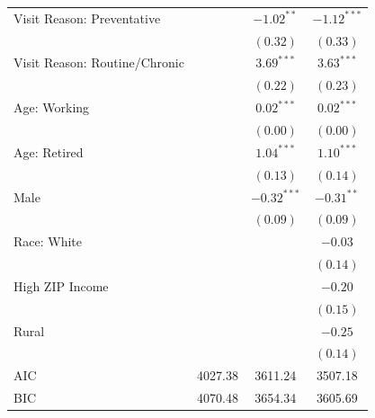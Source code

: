 \documentclass[12pt,twoside]{reedthesis}
\begin{document}
\begin{table}
\begin{center}
\begin{small}
\begin{tabular}{l c c c }
  Visit Reason: Preventative    &                        & $-1.02^{**}$           & $\mathbf{-1.12}^{***}$ \\
                                &                        & $(0.32)$               & $(0.33)$               \\
  Visit Reason: Routine/Chronic &                        & $\mathbf{3.69}^{***}$  & $\mathbf{3.63}^{***}$  \\
                                &                        & $(0.22)$               & $(0.23)$               \\
  Age: Working                  &                        & $\mathbf{0.02}^{***}$  & $\mathbf{0.02}^{***}$  \\
                                &                        & $(0.00)$               & $(0.00)$               \\
  Age: Retired                  &                        & $\mathbf{1.04}^{***}$  & $\mathbf{1.10}^{***}$  \\
                                &                        & $(0.13)$               & $(0.14)$               \\
  Male                          &                        & $\mathbf{-0.32}^{***}$ & $-0.31^{**}$           \\
                                &                        & $(0.09)$               & $(0.09)$               \\
  Race: White                   &                        &                        & $-0.03$                \\
                                &                        &                        & $(0.14)$               \\
  High ZIP Income               &                        &                        & $-0.20$                \\
                                &                        &                        & $(0.15)$               \\
  Rural                         &                        &                        & $-0.25$                \\
                                &                        &                        & $(0.14)$               \\
  \hline
  AIC                           & 4027.38                & 3611.24                & 3507.18                \\
  BIC                           & 4070.48                & 3654.34                & 3605.69                \\

\end{tabular}
\end{small}
\end{center}
\end{table}
\end{document}
